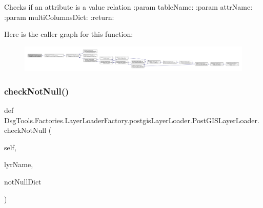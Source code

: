 \begin{DoxyVerb}Checks if an attribute is a value relation
:param tableName:
:param attrName:
:param multiColumnsDict:
:return:
\end{DoxyVerb}
 Here is the caller graph for this function\+:
\nopagebreak
\begin{figure}[H]
\begin{center}
\leavevmode
\includegraphics[width=350pt]{class_dsg_tools_1_1_factories_1_1_layer_loader_factory_1_1postgis_layer_loader_1_1_post_g_i_s_layer_loader_ab900892c310136c038574363524b98c0_icgraph}
\end{center}
\end{figure}
\mbox{\label{class_dsg_tools_1_1_factories_1_1_layer_loader_factory_1_1postgis_layer_loader_1_1_post_g_i_s_layer_loader_a18448c4aaba1d0027c0ac9c29eaa7280}} 
\subsubsection{\texorpdfstring{check\+Not\+Null()}{checkNotNull()}}
{\footnotesize\ttfamily def Dsg\+Tools.\+Factories.\+Layer\+Loader\+Factory.\+postgis\+Layer\+Loader.\+Post\+G\+I\+S\+Layer\+Loader.\+check\+Not\+Null (\begin{DoxyParamCaption}\item[{}]{self,  }\item[{}]{lyr\+Name,  }\item[{}]{not\+Null\+Dict }\end{DoxyParamCaption})}

